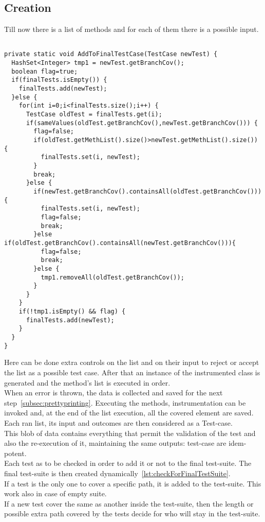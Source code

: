 \subsection{Creation}\label{subsec:creation}
Till now there is a list of methods and for each of them there is a possible input.
\begin{lstlisting}[caption={Check-test method},label={lst:checkForFinalTestSuite}]% Start your code-block

private static void AddToFinalTestCase(TestCase newTest) {
  HashSet<Integer> tmp1 = newTest.getBranchCov();
  boolean flag=true;
  if(finalTests.isEmpty()) {
	finalTests.add(newTest);
  }else {
	for(int i=0;i<finalTests.size();i++) {
      TestCase oldTest = finalTests.get(i);
	  if(sameValues(oldTest.getBranchCov(),newTest.getBranchCov())) {
		flag=false;
		if(oldTest.getMethList().size()>newTest.getMethList().size()) {
		  finalTests.set(i, newTest);
		}
		break;
	  }else {
		if(newTest.getBranchCov().containsAll(oldTest.getBranchCov())) {
		  finalTests.set(i, newTest);
		  flag=false;
		  break;
		}else if(oldTest.getBranchCov().containsAll(newTest.getBranchCov())){
		  flag=false;
		  break;
		}else {
		  tmp1.removeAll(oldTest.getBranchCov());
		}
	  }
	}
	if(!tmp1.isEmpty() && flag) {
	  finalTests.add(newTest);
	}
  }
}
\end{lstlisting}
Here can be done extra controls on the list and on their input to reject or accept the list as a possible test case.
After that an instance of the instrumented class is generated and the method's list is executed in order.\\
When an error is thrown, the data is collected and saved for the next step~\ref{subsec:prettyprinting}.
Executing the methods, instrumentation can be invoked and, at the end of the list execution, all the covered element are saved.\\
Each ran list, its input and outcomes are then considered as a Test-case.\\
This blob of data contains everything that permit the validation of the test and also the re-execution of it, maintaining the same outputs: test-case are idem-potent.\\
Each test as to be checked in order to add it or not to the final test-suite.
The final test-suite is then created dynamically~\ref{lst:checkForFinalTestSuite}.\\
If a test is the only one to cover a specific path, it is added to  the test-suite.
This work also in case of empty suite.\\
If a new test cover the same as another inside the test-suite, then the length or possible extra path covered by the tests decide for who will stay in the test-suite.

